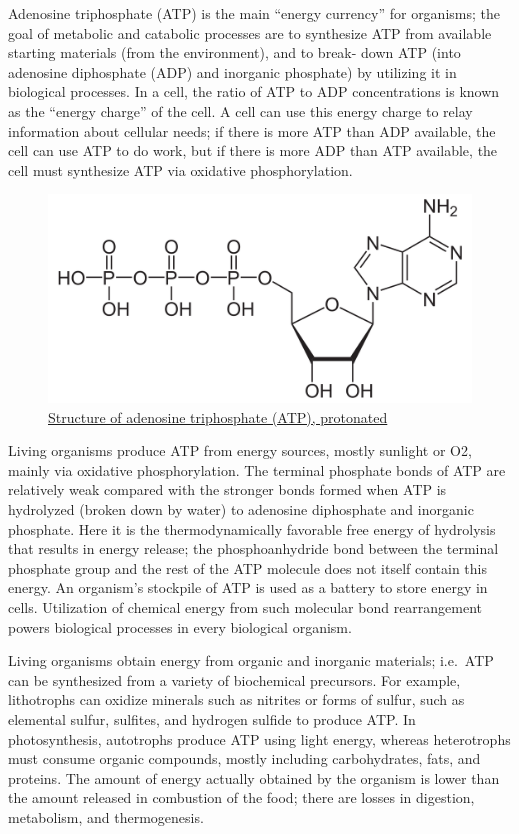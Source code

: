 Adenosine triphosphate (ATP) is the main ``energy currency'' for organisms; the goal of metabolic and catabolic processes are to synthesize ATP from available starting materials (from the environment), and to break- down ATP (into adenosine diphosphate (ADP) and inorganic phosphate) by utilizing it in biological processes. In a cell, the ratio of ATP to ADP concentrations is known as the ``energy charge'' of the cell. A cell can use this energy charge to relay information about cellular needs; if there is more ATP than ADP available, the cell can use ATP to do work, but if there is more ADP than ATP available, the cell must synthesize ATP via oxidative phosphorylation.



\begin{figure}

{\centering \includegraphics[width=0.7\linewidth]{./figures/bioenergetics/Adenosintriphosphat_protoniert} 

}

\caption{\href{https://commons.wikimedia.org/wiki/File:Adenosintriphosphat_protoniert.svg}{Structure of adenosine triphosphate (ATP), protonated}}\label{fig:atpstrucform}
\end{figure}

Living organisms produce ATP from energy sources, mostly sunlight or O2, mainly via oxidative phosphorylation. The terminal phosphate bonds of ATP are relatively weak compared with the stronger bonds formed when ATP is hydrolyzed (broken down by water) to adenosine diphosphate and inorganic phosphate. Here it is the thermodynamically favorable free energy of hydrolysis that results in energy release; the phosphoanhydride bond between the terminal phosphate group and the rest of the ATP molecule does not itself contain this energy. An organism's stockpile of ATP is used as a battery to store energy in cells. Utilization of chemical energy from such molecular bond rearrangement powers biological processes in every biological organism.

Living organisms obtain energy from organic and inorganic materials; i.e.~ATP can be synthesized from a variety of biochemical precursors. For example, lithotrophs can oxidize minerals such as nitrites or forms of sulfur, such as elemental sulfur, sulfites, and hydrogen sulfide to produce ATP. In photosynthesis, autotrophs produce ATP using light energy, whereas heterotrophs must consume organic compounds, mostly including carbohydrates, fats, and proteins. The amount of energy actually obtained by the organism is lower than the amount released in combustion of the food; there are losses in digestion, metabolism, and thermogenesis.

